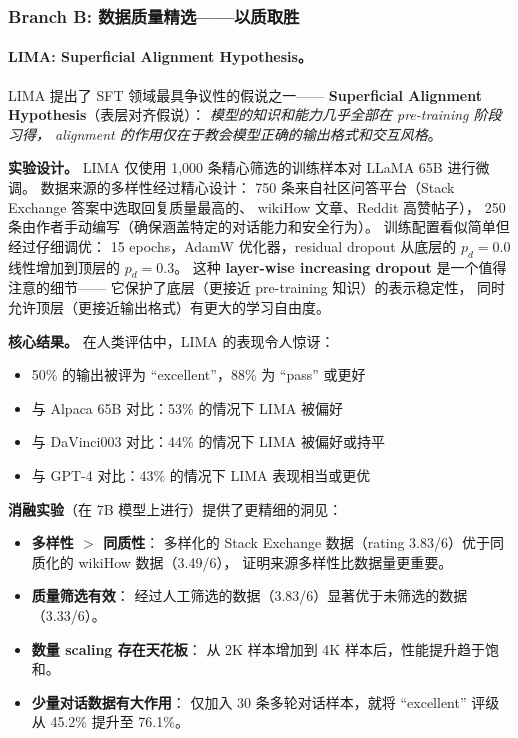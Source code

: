 \subsubsection{Branch B: 数据质量精选——以质取胜}
\label{sec:t1-quality}

\paragraph{LIMA: Superficial Alignment Hypothesis。}
LIMA 提出了 SFT 领域最具争议性的假说之一——
\textbf{Superficial Alignment Hypothesis}（表层对齐假说）：
\textit{模型的知识和能力几乎全部在 pre-training 阶段习得，
alignment 的作用仅在于教会模型正确的输出格式和交互风格}。

\textbf{实验设计。}
LIMA 仅使用 1,000 条精心筛选的训练样本对 LLaMA 65B 进行微调。
数据来源的多样性经过精心设计：
750 条来自社区问答平台（Stack Exchange 答案中选取回复质量最高的、
wikiHow 文章、Reddit 高赞帖子），
250 条由作者手动编写（确保涵盖特定的对话能力和安全行为）。
训练配置看似简单但经过仔细调优：
15 epochs，AdamW 优化器，residual dropout 从底层的 $p_d = 0.0$ 线性增加到顶层的 $p_d = 0.3$。
这种 \textbf{layer-wise increasing dropout} 是一个值得注意的细节——
它保护了底层（更接近 pre-training 知识）的表示稳定性，
同时允许顶层（更接近输出格式）有更大的学习自由度。

\textbf{核心结果。}
在人类评估中，LIMA 的表现令人惊讶：
\begin{itemize}[leftmargin=1.5em]
  \item 50\% 的输出被评为 ``excellent''，88\% 为 ``pass'' 或更好
  \item 与 Alpaca 65B 对比：53\% 的情况下 LIMA 被偏好
  \item 与 DaVinci003 对比：44\% 的情况下 LIMA 被偏好或持平
  \item 与 GPT-4 对比：43\% 的情况下 LIMA 表现相当或更优
\end{itemize}

\textbf{消融实验}（在 7B 模型上进行）提供了更精细的洞见：
\begin{itemize}[leftmargin=1.5em]
  \item \textbf{多样性 $>$ 同质性}：
    多样化的 Stack Exchange 数据（rating 3.83/6）优于同质化的 wikiHow 数据（3.49/6），
    证明来源多样性比数据量更重要。
  \item \textbf{质量筛选有效}：
    经过人工筛选的数据（3.83/6）显著优于未筛选的数据（3.33/6）。
  \item \textbf{数量 scaling 存在天花板}：
    从 2K 样本增加到 4K 样本后，性能提升趋于饱和。
  \item \textbf{少量对话数据有大作用}：
    仅加入 30 条多轮对话样本，就将 ``excellent'' 评级从 45.2\% 提升至 76.1\%。
\end{itemize}

